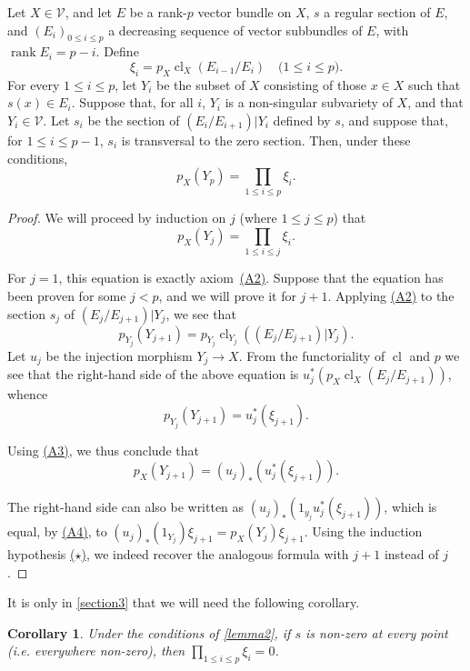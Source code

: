 \documentclass{article}
\theoremstyle{plain}
\newenvironment{lemma}[1]
    {\renewcommand\theinnercustomlemma{#1}\innercustomlemma}
    {\endinnercustomlemma}
\newtheorem*{corollary}{Corollary}
\theoremstyle{definition}
\newcommand{\cat}[1]{{\mathcal{#1}}}
\renewcommand{\leq}{\leqslant}
\DeclareMathOperator{\rank}{rank}
\DeclareMathOperator{\cl}{cl}
\newcommand{\oldpage}[1]{\marginpar{\footnotesize$\Big\vert$ \textit{p.~#1}}}
\begin{document}
\begin{lemma}{2}
\label{lemma2}
  Let $X\in\cat{V}$, and let $E$ be a rank-$p$ vector bundle on $X$, $s$ a regular section of $E$, and $(E_i)_{0\leq i\leq p}$ a decreasing sequence of vector subbundles of $E$, with $\rank E_i=p-i$.
  Define
  \[
    \xi_i = p_X\cl_X(E_{i-1}/E_i)
    \quad\mbox{($1\leq i\leq p$).}
  \]
  For every $1\leq i\leq p$, let $Y_i$ be the subset of $X$ consisting of those $x\in X$ such that $s(x)\in E_i$.
  Suppose that, for all $i$, $Y_i$ is a non-singular subvariety of $X$, and that $Y_i\in\cat{V}$.
  Let $s_i$ be the section of $(E_i/E_{i+1})|Y_i$ defined by $s$, and suppose that, for $1\leq i\leq p-1$, $s_i$ is transversal to the zero section.
  Then, under these conditions,
  \[
    p_X(Y_p) = \prod_{1\leq i\leq p}\xi_i.
  \]
\end{lemma}

\begin{proof}
  We will proceed by induction on $j$ (where $1\leq j\leq p$) that
  \[
    \label{lemma2equationstar}
    p_X(Y_j) = \prod_{1\leq i\leq j}\xi_i.
    \tag{$\star$}
  \]

  For $j=1$, this equation is exactly axiom~\hyperref[axiomA2]{(A2)}.
  Suppose that the equation has been proven for some $j<p$, and we will prove it for $j+1$.
  Applying \hyperref[axiomA2]{(A2)} to the section $s_j$ of $(E_j/E_{j+1})|Y_j$, we see that
  \[
    p_{Y_j}(Y_{j+1}) = p_{Y_j}\cl_{Y_j}((E_j/E_{j+1})|Y_j).
  \]
  Let $u_j$ be the injection morphism $Y_j\to X$.
  From the functoriality of $\cl$ and $p$ we see that the right-hand side of the above equation is $u_j^*(p_X\cl_X(E_j/E_{j+1}))$, whence
  \[
    p_{Y_j}(Y_{j+1}) = u_j^*(\xi_{j+1}).
  \]

  \oldpage{142}
  Using \hyperref[axiomA3]{(A3)}, we thus conclude that
  \[
    p_X(Y_{j+1}) = (u_j)_*(u_j^*(\xi_{j+1})).
  \]

  The right-hand side can also be written as $(u_j)_*(1_{y_j}u_j^*(\xi_{j+1}))$, which is equal, by \hyperref[axiomA4]{(A4)}, to $(u_j)_*(1_{Y_j})\xi_{j+1} = p_X(Y_j)\xi_{j+1}$.
  Using the induction hypothesis \hyperref[lemma2equationstar]{($\star$)}, we indeed recover the analogous formula with $j+1$ instead of $j$.
\end{proof}

It is only in \cref{section3} that we will need the following corollary.
\begin{corollary}
\label{lemma2corollary}
  Under the conditions of \cref{lemma2}, if $s$ is non-zero at every point (i.e. everywhere non-zero), then $\prod_{1\leq i\leq p}\xi_i=0$.
\end{corollary}
\end{document}
